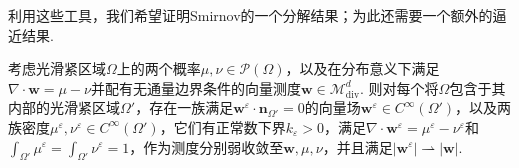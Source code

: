 利用这些工具，我们希望证明Smirnov的一个分解结果\cite{b287}；为此还需要一个额外的逼近结果.

\begin{lemma}\label{obj:4.8}
考虑光滑紧区域$\Omega$上的两个概率$\mu,\nu\in\mathscr P(\Omega)$，以及在分布意义下满足$\nabla\cdot\mathbf w=\mu-\nu$并配有无通量边界条件的向量测度$\mathbf w\in\mathscr M^d_{\mathrm{div}}$. 则对每个将$\Omega$包含于其内部的光滑紧区域$\Omega'$，存在一族满足$\mathbf w^\varepsilon\cdot\mathbf n_{\Omega'}=0$的向量场$\mathbf w^\varepsilon\in C^\infty(\Omega')$，以及两族密度$\mu^\varepsilon,\nu^\varepsilon\in C^\infty(\Omega')$，它们有正常数下界$k_\varepsilon>0$，满足$\nabla\cdot\mathbf w^\varepsilon=\mu^\varepsilon-\nu^\varepsilon$和$\int_{\Omega'}\mu^\varepsilon=\int_{\Omega'}\nu^\varepsilon=1$，作为测度分别弱收敛至$\mathbf w,\mu,\nu$，并且满足$|\mathbf w^\varepsilon|\rightharpoonup|\mathbf w|$.
\end{lemma}
